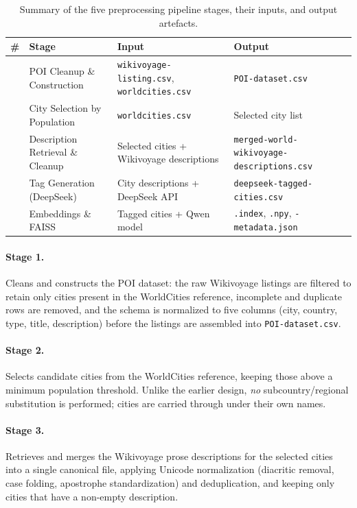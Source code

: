\documentclass[12pt,a4paper]{report}
\begin{document}
\begin{table}[htbp]
\centering
\small
\renewcommand{\arraystretch}{1.3}
\begin{tabularx}{\textwidth}{
    >{\centering\arraybackslash}p{0.4cm}
    >{\raggedright\arraybackslash}p{3.5cm}
    >{\raggedright\arraybackslash}p{3.8cm}
    >{\raggedright\arraybackslash}X}
\toprule
\textbf{\#} & \textbf{Stage} & \textbf{Input} & \textbf{Output} \\
\midrule
1 & POI Cleanup \& Construction & \texttt{wikivoyage-listing.csv}, \texttt{worldcities.csv} & \texttt{POI-dataset.csv} \\
2 & City Selection by Population & \texttt{worldcities.csv} & Selected city list \\
3 & Description Retrieval \& Cleanup & Selected cities + Wikivoyage descriptions & \texttt{merged-world-wikivoyage-descriptions.csv} \\
4 & Tag Generation (DeepSeek) & City descriptions + DeepSeek API & \texttt{deepseek-tagged-cities.csv} \\
5 & Embeddings \& FAISS     & Tagged cities + Qwen model & \texttt{.index}, \texttt{.npy}, \texttt{-metadata.json} \\
\bottomrule
\end{tabularx}
\caption{Summary of the five preprocessing pipeline stages, their inputs, and output artefacts.}
\label{tab:preprocessing-summary}
\end{table}

\paragraph{Stage 1.} Cleans and constructs the POI dataset: the raw Wikivoyage listings are filtered
to retain only cities present in the WorldCities reference, incomplete and duplicate rows are removed,
and the schema is normalized to five columns (city, country, type, title, description) before the
listings are assembled into \texttt{POI-dataset.csv}.

\paragraph{Stage 2.} Selects candidate cities from the WorldCities reference, keeping those above a
minimum population threshold. Unlike the earlier design, \emph{no} subcountry/regional substitution is
performed; cities are carried through under their own names.

\paragraph{Stage 3.} Retrieves and merges the Wikivoyage prose descriptions for the selected cities
into a single canonical file, applying Unicode normalization (diacritic removal, case folding,
apostrophe standardization) and deduplication, and keeping only cities that have a non-empty
description.
\end{document}
